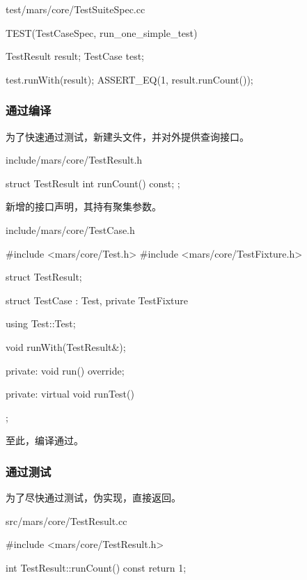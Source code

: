\begin{content}
\begin{nodiff}{test/mars/core/TestSuiteSpec.cc}
\begin{c++}
TEST(TestCaseSpec, run_one_simple_test) {
  TestResult result;
  TestCase test;
  
  test.runWith(result);
  ASSERT_EQ(1, result.runCount());
}
 \end{c++}
\end{nodiff}

\subsubsection{通过编译}

为了快速通过测试，新建头文件，并对外提供查询接口。

\begin{nodiff}{include/mars/core/TestResult.h}
 \begin{c++}
struct TestResult {
  int runCount() const;
};
 \end{c++}
\end{nodiff}

新增的接口声明，其持有聚集参数。

\begin{nodiff}{include/mars/core/TestCase.h}
 \begin{c++}
#include <mars/core/Test.h>
#include <mars/core/TestFixture.h>

struct TestResult;

struct TestCase : Test, private TestFixture {
  using Test::Test;

  void runWith(TestResult&);

private:
  void run() override;

private:
  virtual void runTest() {}
};
 \end{c++}
\end{nodiff}

至此，编译通过。

\subsubsection{通过测试}

为了尽快通过测试，伪实现，直接返回。

\begin{nodiff}{src/mars/core/TestResult.cc}
 \begin{c++}
#include <mars/core/TestResult.h>

int TestResult::runCount() const {
  return 1;
}
 \end{c++}
\end{nodiff}


\end{content}
